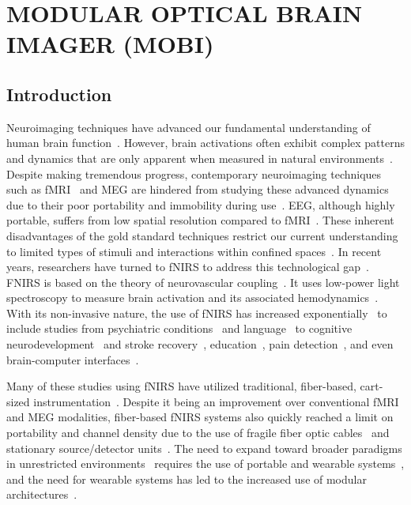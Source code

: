 
\chapter{MODULAR OPTICAL BRAIN IMAGER (MOBI)} %
\label{chap:mobi}


\section{Introduction} %
\label{chap:mobi:introduction}
Neuroimaging techniques have advanced our fundamental understanding of human brain function~\cite{Crum2021}. However, brain activations often exhibit complex patterns and dynamics that are only apparent when measured in natural environments~\cite{Park2018, Crum2021}. Despite making tremendous progress, contemporary neuroimaging techniques such as \ac{fMRI}~\cite{Heinzel2013} and \ac{MEG} are hindered from studying these advanced dynamics due to their poor portability and immobility during use~\cite{Herold2017, Yucel2017}. \ac{EEG}, although highly portable, suffers from low spatial resolution compared to \ac{fMRI}~\cite{Sirpal2019, Herold2017}. These inherent disadvantages of the gold standard techniques restrict our current understanding to limited types of stimuli and interactions within confined spaces~\cite{Park2018}. In recent years, researchers have turned to \ac{fNIRS} to address this technological gap~\cite{Boas2014}. FNIRS is based on the theory of neurovascular coupling~\cite{Ferrari2012}. It uses low-power light spectroscopy to measure brain activation and its associated hemodynamics~\cite{Boas2014}. With its non-invasive nature, the use of \ac{fNIRS} has increased exponentially~\cite{Quaresima2019, Yucel2017} to include studies from psychiatric conditions~\cite{Ehlis2014, Kumar2017} and language~\cite{Quaresima2012, Rossi2012, Jackson2019} to cognitive neurodevelopment~\cite{Aslin2015, Vanderwert2014, Wilcox2015, Soltanlou2018} and stroke recovery~\cite{Yang2019}, education~\cite{Brockington2018}, pain detection~\cite{LopezMartinez2019}, and even brain-computer interfaces~\cite{Naseer2015, Ahn2017, Hong2018}.

Many of these studies using \ac{fNIRS} have utilized traditional, fiber-based, cart-sized instrumentation~\cite{Scholkmann2014, Eggebrecht2014, Wheelock2019, Everdell2005}. Despite it being an improvement over conventional \ac{fMRI} and \ac{MEG} modalities, fiber-based \ac{fNIRS} systems also quickly reached a limit on portability and channel density due to the use of fragile fiber optic cables~\cite{Saikia2019, Zhao2019} and stationary source/detector units~\cite{Oxymon2017, Techen2018}. The need to expand toward broader paradigms in unrestricted environments~\cite{Crum2021} requires the use of portable and wearable systems~\cite{Curtin2018, Park2018}, and the need for wearable systems has led to the increased use of modular architectures~\cite{Bci2017, Zimmermann2013, Funane2017, Wyser2017, Zhao2020, VidalRosas2021, Liu2022}. 

